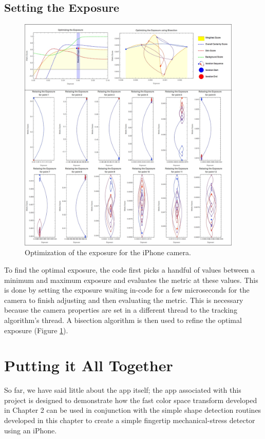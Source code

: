 \subsection{Setting the Exposure}\label{sec:SettingTheExposure}
\begin{figure}[h!]
  \centering
    \includegraphics[width=0.95\textwidth]{Chapter4/Figs/exposureGraphic1.jpg}
    \caption{Optimization of the exposure for the iPhone camera.}\label{fig:ExposureGraphic1}
\end{figure}
To find the optimal exposure, the code first picks a handful of values between a minimum and maximum exposure and evaluates the metric at these values. This is done by setting the exposure waiting in-code for a few microseconds for the camera to finish adjusting and then evaluating the metric. This is necessary because the camera properties are set in a different thread to the tracking algorithm's thread. A bisection algorithm is then used to refine the optimal exposure (Figure  \ref{fig:ExposureGraphic1}).


\section{Putting it All Together}\label{sec:PuttingItAllTogether}
So far, we have said little about the app itself; the app associated with this project is designed to demonstrate how the fast color space transform developed in Chapter 2 can be used in conjunction with the simple shape detection routines developed in this chapter to create a simple fingertip mechanical-stress detector using an iPhone.

